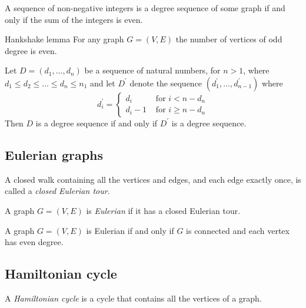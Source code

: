 \documentclass{classnotes}
\begin{document}
\begin{remark}
    A sequence of non-negative integers is a degree sequence of some graph if and only if the sum of the integers is even.
\end{remark}

\begin{lemma}{Hankshake lemma}
    For any graph $G=(V,E)$ the number of vertices of odd degree is even.
\end{lemma}

\begin{theorem}
    Let $D = (d_1,\dots,d_n)$ be a sequence of natural numbers, for $n > 1$, where $d_1 \le d_2 \le \dots \le d_n \le n_1$ and let $D^\prime$ denote the
    sequence $(d_1^\prime,\dots,d_{n-1}^\prime)$ where 
    $$d_i^\prime = \begin{cases}d_i &\text{ for } i < n-d_n \\ d_i - 1 &\text{ for }i\ge n-d_n\end{cases}$$
    Then $D$ is a degree sequence if and only if $D^\prime$ is a degree sequence.
\end{theorem}

\subsection{Eulerian graphs}
\begin{definition}
    A closed walk containing all the vertices and edges, and each edge exactly once, is called a \emph{closed Eulerian tour}.
\end{definition}

\begin{definition}
    A graph $G=(V,E)$ is \emph{Eulerian} if it has a closed Eulerian tour.
\end{definition}

\begin{theorem}
    A graph $G=(V,E)$ is Eulerian if and only if $G$ is connected and each vertex has even degree.
\end{theorem}

\subsection{Hamiltonian cycle}
\begin{definition}
    A \emph{Hamiltonian cycle} is a cycle that contains all the vertices of a graph.
\end{definition}
\end{document}

